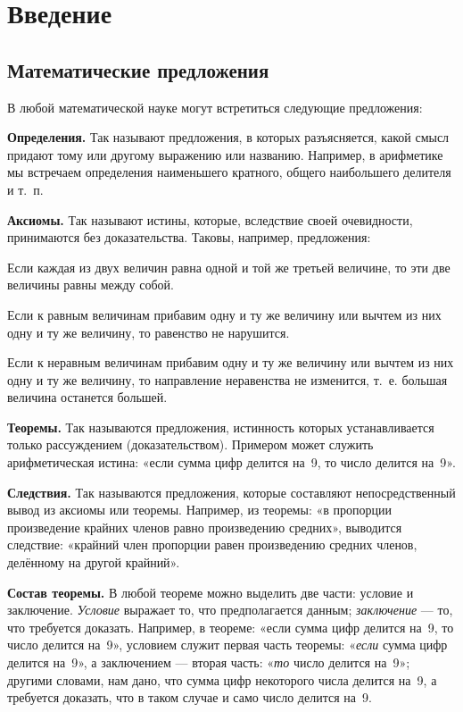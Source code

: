 \chapter*{Введение}

\section*{Математические предложения}

 В любой математической науке могут встретиться следующие предложения:

\textbf{Определения.} Так называют предложения, в которых разъясняется, какой смысл придают тому или другому выражению или названию. Например, в арифметике мы встречаем определения наименьшего кратного, общего наибольшего делителя и т.~п.

\textbf{Аксиомы.} Так называют истины, которые, вследствие своей очевидности, принимаются без доказательства. Таковы, например, предложения:

Если каждая из двух величин равна одной и той же третьей величине, то эти две величины равны между собой.

Если к равным величинам прибавим одну и ту же величину или вычтем из них одну и ту же величину, то равенство не нарушится.

Если к неравным величинам прибавим одну и ту же величину или вычтем из них одну и ту же величину, то направление неравенства не изменится, т.~е. большая величина останется большей.

\textbf{Теоремы.} Так называются предложения, истинность которых устанавливается только рассуждением (доказательством). Примером может служить арифметическая истина: «если сумма цифр делится на~9, то число делится на~9».

\textbf{Следствия.} Так называются предложения, которые составляют непосредственный вывод из аксиомы или теоремы. Например, из теоремы: «в пропорции произведение крайних членов равно произведению средних», выводится следствие: «крайний член пропорции равен произведению средних членов, делённому на другой крайний».

 \textbf{Состав теоремы.} В любой теореме можно выделить две части: условие и заключение. \emph{Условие} выражает то, что предполагается данным; \emph{заключение} --- то, что требуется доказать. Например, в теореме: «если сумма цифр делится на~9, то число делится на~9», условием служит первая часть теоремы: «\emph{если} сумма цифр делится на~9», а заключением --- вторая часть: «\emph{то} число делится на~9»; другими словами, нам дано, что сумма цифр некоторого числа делится на~9, а требуется доказать, что в таком случае и само число делится на~9.

